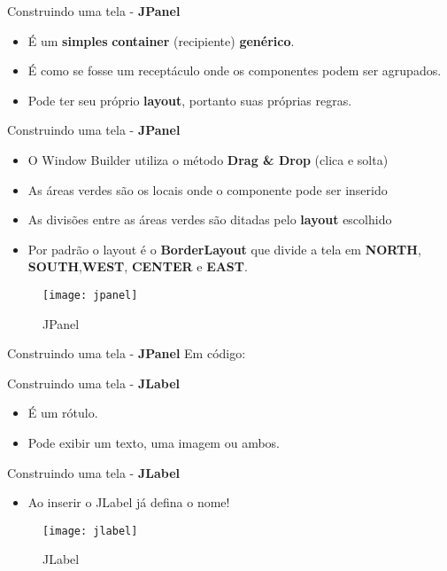 \documentclass[10pt]{beamer}
\begin{document}
\begin{frame}{Construindo uma tela - \textbf{JPanel}}
\begin{itemize}
\item É um \textbf{simples} \textbf{container} (recipiente) \textbf{genérico}.
\item É como se fosse um receptáculo onde os componentes podem ser agrupados.
\item Pode ter seu próprio \textbf{layout}, portanto suas próprias regras.
\end{itemize}
\end{frame}{}

\begin{frame}{Construindo uma tela - \textbf{JPanel}}
\begin{itemize}
\item O Window Builder utiliza o método \textbf{Drag \& Drop} (clica e solta)
\item As áreas verdes são os locais onde o componente pode ser inserido
\item As divisões entre as áreas verdes são ditadas pelo \textbf{layout} escolhido
\item Por padrão o layout é o \textbf{BorderLayout} que divide a tela em \textbf{NORTH}, \textbf{SOUTH},\textbf{WEST}, \textbf{CENTER} e \textbf{EAST}.
\end{itemize}
\begin{figure}[!htb]
    \centering
    \texttt{[image: jpanel]}
    \caption{JPanel}
    \label{figRotulo}
  \end{figure}
\end{frame}{}

\begin{frame}{Construindo uma tela - \textbf{JPanel}}
Em código:

\end{frame}{}

\begin{frame}{Construindo uma tela - \textbf{JLabel}}
\begin{itemize}
\item É um rótulo.
\item Pode exibir um texto, uma imagem ou ambos.
\end{itemize}
\end{frame}{}


\begin{frame}{Construindo uma tela - \textbf{JLabel}}
\begin{itemize}
\item Ao inserir o JLabel já defina o nome!
\end{itemize}
\begin{figure}[!htb]
    \centering
    \texttt{[image: jlabel]}
    \caption{JLabel}
    \label{figRotulo}
  \end{figure}
\end{frame}{}
\end{document}
